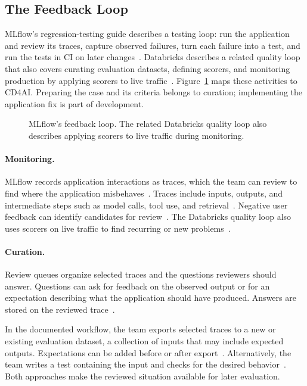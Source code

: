 \subsection{The Feedback Loop}

MLflow's regression-testing guide describes a testing loop: run the
application and review its traces, capture observed failures, turn each
failure into a test, and run the tests in CI on later
changes~\parencite{MLflow:RegressionGuide}. Databricks describes a related
quality loop that also covers curating evaluation datasets, defining scorers,
and monitoring production by applying scorers to live
traffic~\parencite{Databricks:QualityLoop}. Figure~\ref{fig:case-mlflow} maps
these activities to CD4AI. Preparing the case and its criteria belongs to
curation; implementing the application fix is part of development.

\begin{figure}[H]
  \centering
  
  \caption{MLflow's feedback loop. The related Databricks quality loop also
    describes applying scorers to live traffic during monitoring.}
  \label{fig:case-mlflow}
\end{figure}

\paragraph{Monitoring.}
MLflow records application interactions as traces, which the team can review
to find where the application misbehaves~\parencite{MLflow:RegressionGuide}.
Traces include inputs, outputs, and intermediate steps such as model calls,
tool use, and retrieval~\parencite{Databricks:QualityLoop}. Negative user feedback can identify
candidates for review~\parencite{MLflow:RegressionGuide}. The Databricks
quality loop also uses scorers on live traffic to find recurring or new
problems~\parencite{Databricks:QualityLoop}.

\paragraph{Curation.}
Review queues organize selected traces and the questions reviewers should
answer. Questions can ask for feedback on the observed output or for an
expectation describing what the application should have produced. Answers
are stored on the reviewed trace~\parencite{MLflow:ReviewQueues}.

In the documented workflow, the team exports selected traces to a new or
existing evaluation dataset, a collection of inputs that may include expected
outputs. Expectations can be added before or after
export~\parencite{MLflow:Datasets}. Alternatively, the team writes a test
containing the input and checks for the desired
behavior~\parencite{MLflow:RegressionGuide}. Both approaches make the reviewed
situation available for later evaluation.

